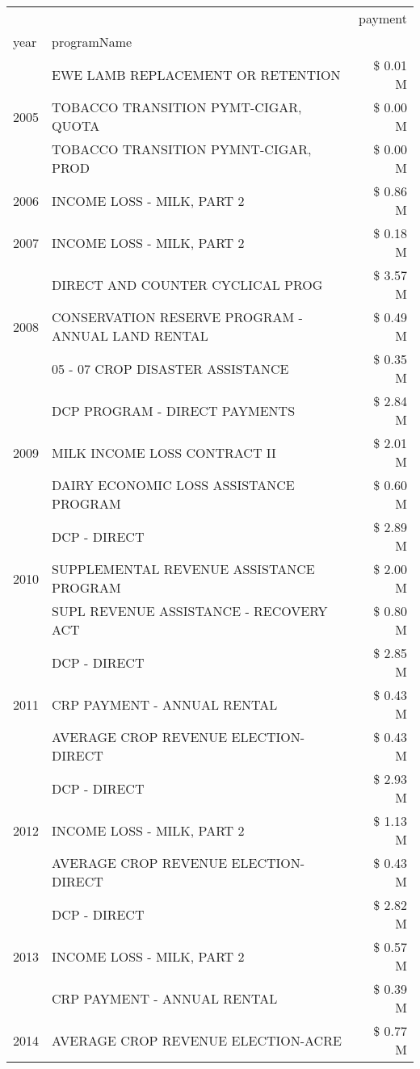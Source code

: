 \begin{tabular}{llr}
\toprule
 &  & payment \\
year & programName &  \\
\midrule
\multirow[t]{3}{*}{2005} & EWE LAMB REPLACEMENT OR RETENTION & \$ 0.01 M \\
 & TOBACCO TRANSITION PYMT-CIGAR, QUOTA & \$ 0.00 M \\
 & TOBACCO TRANSITION PYMNT-CIGAR, PROD & \$ 0.00 M \\
\cline{1-3}
2006 & INCOME LOSS - MILK, PART 2 & \$ 0.86 M \\
\cline{1-3}
2007 & INCOME LOSS - MILK, PART 2 & \$ 0.18 M \\
\cline{1-3}
\multirow[t]{3}{*}{2008} & DIRECT AND COUNTER CYCLICAL PROG & \$ 3.57 M \\
 & CONSERVATION RESERVE PROGRAM - ANNUAL LAND RENTAL & \$ 0.49 M \\
 & 05 - 07 CROP DISASTER ASSISTANCE & \$ 0.35 M \\
\cline{1-3}
\multirow[t]{3}{*}{2009} & DCP PROGRAM - DIRECT PAYMENTS & \$ 2.84 M \\
 & MILK INCOME LOSS CONTRACT II & \$ 2.01 M \\
 & DAIRY ECONOMIC LOSS ASSISTANCE PROGRAM & \$ 0.60 M \\
\cline{1-3}
\multirow[t]{3}{*}{2010} & DCP - DIRECT & \$ 2.89 M \\
 & SUPPLEMENTAL REVENUE ASSISTANCE PROGRAM & \$ 2.00 M \\
 & SUPL REVENUE ASSISTANCE - RECOVERY ACT & \$ 0.80 M \\
\cline{1-3}
\multirow[t]{3}{*}{2011} & DCP - DIRECT & \$ 2.85 M \\
 & CRP PAYMENT - ANNUAL RENTAL & \$ 0.43 M \\
 & AVERAGE CROP REVENUE ELECTION-DIRECT & \$ 0.43 M \\
\cline{1-3}
\multirow[t]{3}{*}{2012} & DCP - DIRECT & \$ 2.93 M \\
 & INCOME LOSS - MILK, PART 2 & \$ 1.13 M \\
 & AVERAGE CROP REVENUE ELECTION-DIRECT & \$ 0.43 M \\
\cline{1-3}
\multirow[t]{3}{*}{2013} & DCP - DIRECT & \$ 2.82 M \\
 & INCOME LOSS - MILK, PART 2 & \$ 0.57 M \\
 & CRP PAYMENT - ANNUAL RENTAL & \$ 0.39 M \\
\cline{1-3}
\multirow[t]{3}{*}{2014} & AVERAGE CROP REVENUE ELECTION-ACRE & \$ 0.77 M \\

\end{tabular}
